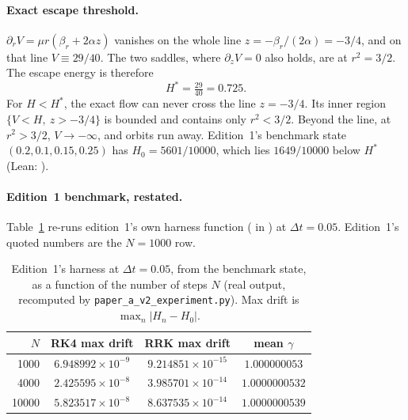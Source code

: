 \documentclass[11pt,a4paper]{article}
\theoremstyle{definition}
\newcommand{\Hs}{H^{*}}
\newcommand{\lean}[1]{\texttt{\detokenize{#1}}}
\begin{document}
\paragraph{Exact escape threshold.} $\partial_rV=\mu r(\beta_r+2\alpha z)$ vanishes on the whole line $z=-\beta_r/(2\alpha)=-3/4$, and on that line $V\equiv 29/40$. The two saddles, where $\partial_zV=0$ also holds, are at $r^2=3/2$. The escape energy is therefore
\begin{equation}
\Hs=\tfrac{29}{40}=0.725 .
\end{equation}
For $H<\Hs$, the exact flow can never cross the line $z=-3/4$. Its inner region $\{V<H,\ z>-3/4\}$ is bounded and contains only $r^2<3/2$. Beyond the line, at $r^2>3/2$, $V\to-\infty$, and orbits run away. Edition~1's benchmark state $(0.2,0.1,0.15,0.25)$ has $H_0=5601/10000$, which lies $1649/10000$ below $\Hs$ (Lean: \lean{harness_initial_energy}).

\paragraph{Edition~1 benchmark, restated.} Table~\ref{tab:harness} re-runs edition~1's own harness function ( in ) at $\Delta t=0.05$. Edition~1's quoted numbers are the $N=1000$ row.

\begin{table}[htbp]
\centering
\caption{Edition~1's harness at $\Delta t=0.05$, from the benchmark state, as a function of the number of steps $N$ (real output, recomputed by \texttt{paper\_a\_v2\_experiment.py}). Max drift is $\max_n|H_n-H_0|$.}
\label{tab:harness}
\small
\begin{tabular}{@{}rccc@{}}
\toprule
$N$ & RK4 max drift & RRK max drift & mean $\gamma$ \\
\midrule
1000 & $6.948992\times10^{-9}$ & $9.214851\times10^{-15}$ & $1.000000053$ \\
4000 & $2.425595\times10^{-8}$ & $3.985701\times10^{-14}$ & $1.0000000532$ \\
10000 & $5.823517\times10^{-8}$ & $8.637535\times10^{-14}$ & $1.0000000539$ \\
\bottomrule
\end{tabular}
\end{table}
\end{document}
